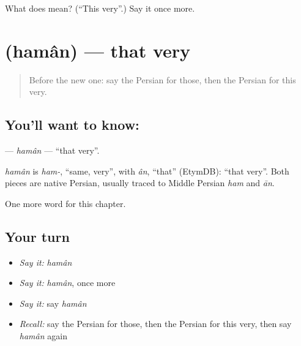 \begin{tcolorbox}[breakable,colback=teal!4,colframe=teal!35!black,title={Before you move on}]
What does  mean? (\textquotedblleft{}This very\textquotedblright{}.) Say it once more.
\end{tcolorbox}
\section[\texorpdfstring{\fa{همان} (hamân)}{همان (hamân)}]{ (hamân) — that very}

\label{lesson:FA-C83-haman}



\begin{quote}
Before the new one: say the Persian for those, then the Persian for this very.
\end{quote}

\subsection*{You'll want to know: }
\textbf{} — \emph{hamân} — \textquotedblleft{}that very\textquotedblright{}.

\begin{cousinweb}
\emph{hamân} is \emph{ham-}, \textquotedblleft{}same, very\textquotedblright{}, with \emph{ân}, \textquotedblleft{}that\textquotedblright{} (EtymDB): \textquotedblleft{}that very\textquotedblright{}. Both pieces are native Persian, usually traced to Middle Persian \emph{ham} and \emph{ān}.
\end{cousinweb}

\begin{grammarlens}[title={What you've built}]
One more word for this chapter.
\end{grammarlens}

\subsection*{Your turn}
\begin{itemize}
\raggedright
  \item \emph{Say it:} \emph{hamân}
  \item \emph{Say it:} \emph{hamân}, once more
  \item \emph{Say it:} say \emph{hamân}
  \item \emph{Recall:} say the Persian for those, then the Persian for this very, then say \emph{hamân} again
\end{itemize}


